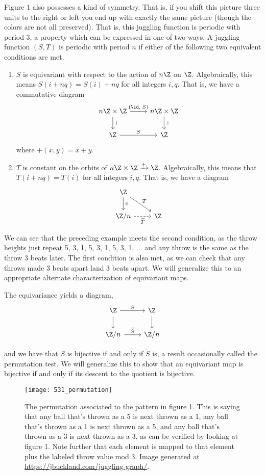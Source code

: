 \documentclass[12nt]{article}
\theoremstyle{plain}
\begin{document}
Figure 1 also possesses a kind of symmetry. That is, if you shift this picture three units to the right or left you end up with exactly the same picture (though the colors are not all preserved). That is, this juggling function is periodic with period 3, a property which can be expressed in one of two ways. A juggling function $(S, T)$ is periodic with period $n$ if either of the following two equivalent conditions are met. 

\begin{enumerate}
\item
$S$ is equivariant with respect to the action of $n\Z$ on $\Z$. Algebraically, this means $S(i + nq) = S(i) + nq$ for all integers $i, q$. That is, we have a commutative diagram
\[
\begin{tikzcd}
n\Z \times \Z \ar[d, "+"] \ar[r, "(\id \text{, } S)"] & n\Z \times \Z \ar[d, "+"] \\
\Z \ar[r, "S"] & \Z
\end{tikzcd}
\]
where $+(x, y) = x + y$.
\item
$T$ is constant on the orbits of $n\Z \times \Z \xrightarrow{+} \Z$. Algebraically, this means that $T(i + nq) = T(i)$ for all integers $i, q$. That is, we have a diagram
\[
\begin{tikzcd}
\Z \ar[d, "\pi"] \ar[dr, "T"] \\
\Z/n \ar[r, dashed, "\widetilde{T}"'] & \Z
\end{tikzcd}
\]
\end{enumerate}

We can see that the preceding example meets the second condition, as the throw heights just repeat 5, 3, 1, 5, 3, 1, 5, 3, 1, ... and any throw is the same as the throw 3 beats later. The first condition is also met, as we can check that any throws made 3 beats apart land 3 beats apart. We will generalize this to an appropriate alternate characterization of equivariant maps.


The equivariance yields a diagram,
\[
\begin{tikzcd}
\Z \ar[r, "S"] \ar[d] & \Z \ar[d] \\
\Z/n \ar[r, "\widetilde{S}"] & \Z/n
\end{tikzcd}
\]

and we have that $S$ is bijective if and only if $\widetilde{S}$ is, a result occasionally called the permutation test. We will generalize this to show that an equivariant map is bijective if and only if its descent to the quotient is bijective.

\begin{figure}[ht]
\texttt{[image: 531\_permutation]}
\caption{The permutation associated to the pattern in figure 1. This is saying that any ball that's thrown as a 5 is next thrown as a 1, any ball that's thrown as a 1 is next thrown as a 5, and any ball that's thrown as a 3 is next thrown as a 3, as can be verified by looking at figure 1. Note further that each element is mapped to that element plus the labeled throw value mod 3. Image generated at \textcolor{blue}{\underline{\url{https://jbuckland.com/juggling-graph/}}}.}
\end{figure}
\end{document}
